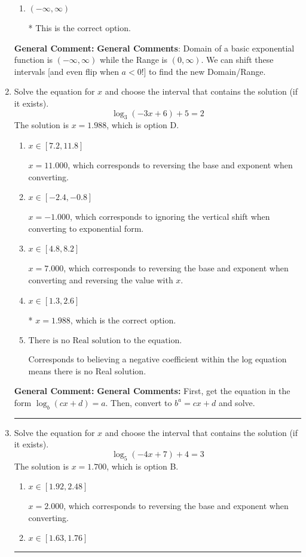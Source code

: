 \documentclass{extbook}[14pt]
\newcommand{\litem}[1]{\item #1

\rule{\textwidth}{0.4pt}}
\begin{document}
\begin{enumerate}
{\begin{enumerate}[label=\Alph*.]
$[-3, \infty)$, which corresponds to using the negative vertical shift AND flipping the Range interval AND including the endpoint.
\item \( (-\infty, \infty) \)

* This is the correct option.
\end{enumerate}

\textbf{General Comment:} \textbf{General Comments}: Domain of a basic exponential function is $(-\infty, \infty)$ while the Range is $(0, \infty)$. We can shift these intervals [and even flip when $a<0$!] to find the new Domain/Range.
}
\litem{
Solve the equation for $x$ and choose the interval that contains the solution (if it exists).
\[ \log_{3}{(-3x+6)}+5 = 2 \]The solution is \( x = 1.988 \), which is option D.\begin{enumerate}[label=\Alph*.]
\item \( x \in [7.2, 11.8] \)

$x = 11.000$, which corresponds to reversing the base and exponent when converting.
\item \( x \in [-2.4, -0.8] \)

$x = -1.000$, which corresponds to ignoring the vertical shift when converting to exponential form.
\item \( x \in [4.8, 8.2] \)

$x = 7.000$, which corresponds to reversing the base and exponent when converting and reversing the value with $x$.
\item \( x \in [1.3, 2.6] \)

* $x = 1.988$, which is the correct option.
\item \( \text{There is no Real solution to the equation.} \)

Corresponds to believing a negative coefficient within the log equation means there is no Real solution.
\end{enumerate}

\textbf{General Comment:} \textbf{General Comments:} First, get the equation in the form $\log_b{(cx+d)} = a$. Then, convert to $b^a = cx+d$ and solve.
}
\litem{
Solve the equation for $x$ and choose the interval that contains the solution (if it exists).
\[ \log_{5}{(-4x+7)}+4 = 3 \]The solution is \( x = 1.700 \), which is option B.\begin{enumerate}[label=\Alph*.]
\item \( x \in [1.92, 2.48] \)

$x = 2.000$, which corresponds to reversing the base and exponent when converting.
\item \( x \in [1.63, 1.76] \)


\end{enumerate}}
\end{enumerate}
\end{document}
